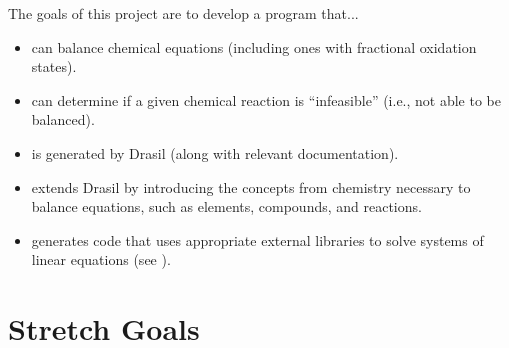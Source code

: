 \documentclass{article}
\begin{document}
The goals of this project are to develop a program that...

\begin{itemize}
    \item can balance chemical equations (including ones with fractional
    oxidation states).
    \item can determine if a given chemical reaction is ``infeasible'' (i.e.,
    not able to be balanced).
    \item is generated by Drasil (along with relevant documentation).
    \item extends Drasil by introducing the concepts from chemistry necessary
    to balance equations, such as elements, compounds, and reactions.
    \item generates code that uses appropriate external libraries to solve
    systems of linear equations (see \cite[Ch. 4]{chen_solving_2022}).
\end{itemize}

\section{Stretch Goals}



\end{document}
